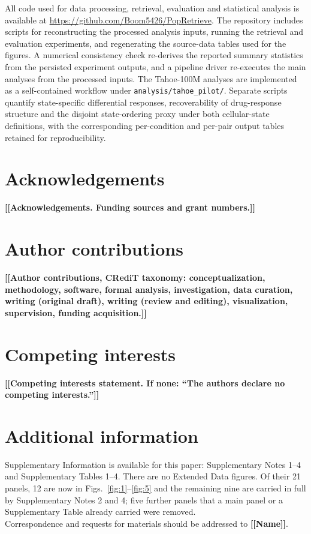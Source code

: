 \documentclass[11pt,letterpaper]{article}
\newcommand{\TODO}[1]{{\color{BrickRed}\textbf{[[#1]]}}}
\begin{document}
All code used for data processing, retrieval, evaluation and statistical analysis is
available at \url{https://github.com/Boom5426/PopRetrieve}. The repository includes scripts for reconstructing the processed analysis inputs,
running the retrieval and evaluation experiments, and regenerating the source-data
tables used for the figures. A numerical consistency check re-derives the reported
summary statistics from the persisted experiment outputs, and a pipeline driver
re-executes the main analyses from the processed inputs. The Tahoe-100M analyses are implemented as a self-contained workflow under
\texttt{analysis/tahoe\_pilot/}. Separate scripts quantify state-specific differential
responses, recoverability of drug-response structure and the disjoint state-ordering
proxy under both cellular-state definitions, with the corresponding per-condition and
per-pair output tables retained for reproducibility.



\section*{Acknowledgements}
\TODO{Acknowledgements. Funding sources and grant numbers.}

\section*{Author contributions}
\TODO{Author contributions, CRediT taxonomy: conceptualization, methodology, software,
formal analysis, investigation, data curation, writing (original draft), writing (review and
editing), visualization, supervision, funding acquisition.}

\section*{Competing interests}
\TODO{Competing interests statement. If none: ``The authors declare no competing interests.''}

\section*{Additional information}
\noindent Supplementary Information is available for this paper: Supplementary Notes 1--4 and
Supplementary Tables 1--4. There are no Extended Data figures. Of their 21 panels, 12 are now in
Figs.~\ref{fig:1}--\ref{fig:5} and the remaining nine are carried in full by Supplementary
Notes 2 and 4; five further panels that a main panel or a Supplementary Table already
carried were removed.\\
Correspondence and requests for materials should be addressed to \TODO{Name}.



\end{document}
